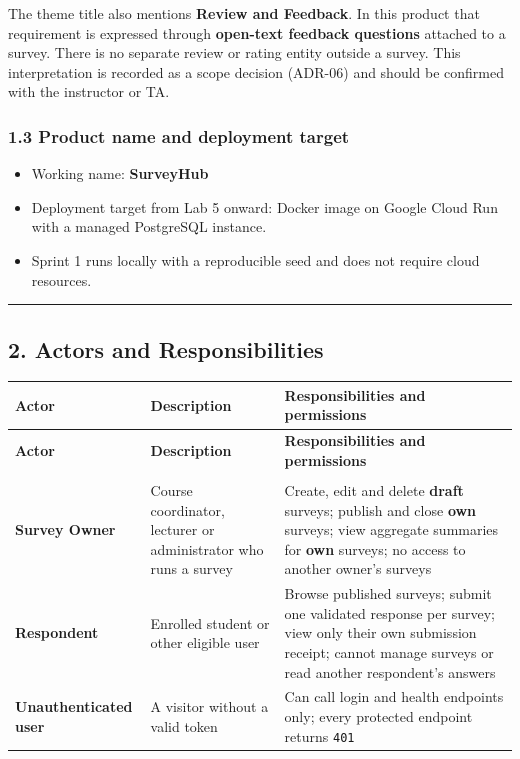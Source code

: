 \documentclass[12pt,a4paper]{article}
\begin{document}
The theme title also mentions \textbf{Review and Feedback}. In this product that requirement is expressed through \textbf{open-text feedback questions} attached to a survey. There is no separate review or rating entity outside a survey. This interpretation is recorded as a scope decision (ADR-06) and should be confirmed with the instructor or TA.

\subsubsection*{1.3 Product name and deployment target}
\begin{itemize}[leftmargin=*]
\item Working name: \textbf{SurveyHub}
\item Deployment target from Lab 5 onward: Docker image on Google Cloud Run with a managed PostgreSQL instance.
\item Sprint 1 runs locally with a reproducible seed and does not require cloud resources.
\end{itemize}

\medskip\noindent\rule{\linewidth}{0.4pt}\medskip

\subsection*{2. Actors and Responsibilities}
{\setlength{\tabcolsep}{3pt}\renewcommand{\arraystretch}{1.08}\small
\begin{longtable}{@{}>{\raggedright\arraybackslash}p{}>{\raggedright\arraybackslash}p{}>{\raggedright\arraybackslash}p{}@{}}
\toprule
\textbf{Actor} & \textbf{Description} & \textbf{Responsibilities and permissions} \\
\midrule
\endfirsthead
\toprule
\textbf{Actor} & \textbf{Description} & \textbf{Responsibilities and permissions} \\
\midrule
\endhead
\midrule
\multicolumn{3}{r}{\footnotesize\textit{Continued on next page}}\\
\endfoot
\bottomrule
\endlastfoot
\textbf{Survey Owner} & Course coordinator, lecturer or administrator who runs a survey & Create, edit and delete \textbf{draft} surveys; publish and close \textbf{own} surveys; view aggregate summaries for \textbf{own} surveys; no access to another owner's surveys \\
\textbf{Respondent} & Enrolled student or other eligible user & Browse published surveys; submit one validated response per survey; view only their own submission receipt; cannot manage surveys or read another respondent's answers \\
\textbf{Unauthenticated user} & A visitor without a valid token & Can call login and health endpoints only; every protected endpoint returns \texttt{401} \\
\end{longtable}}
\end{document}

